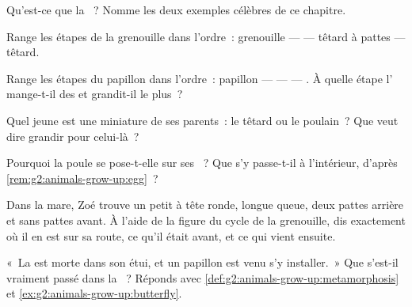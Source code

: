 \begin{exercise}[$\star$]\label{exo:g2:animals-grow-up:4}
Qu'est-ce que la ~? Nomme les deux exemples célèbres de
ce chapitre.
\end{exercise}

\begin{exercise}[$\star$]\label{exo:g2:animals-grow-up:5}
Range les étapes de la grenouille dans l'ordre~: grenouille ---
 --- têtard à pattes --- têtard.
\end{exercise}

\begin{exercise}[$\star$]\label{exo:g2:animals-grow-up:6}
Range les étapes du papillon dans l'ordre~: papillon --- 
---  --- . À quelle étape l' mange-t-il des
 et grandit-il le plus~?
\end{exercise}

\begin{exercise}[$\star$]\label{exo:g2:animals-grow-up:7}
Quel jeune  est une miniature de ses parents~: le têtard ou le
poulain~? Que veut dire grandir pour celui-là~?
\end{exercise}

\begin{exercise}[$\star$]\label{exo:g2:animals-grow-up:8}
Pourquoi la poule se pose-t-elle sur ses ~? Que s'y passe-t-il à
l'intérieur, d'après \cref{rem:g2:animals-grow-up:egg}~?
\end{exercise}

\begin{exercise}[$\star\star$]\label{exo:g2:animals-grow-up:9}
Dans la mare, Zoé trouve un petit  à tête ronde, longue queue,
deux pattes arrière et sans pattes avant. À l'aide de la figure du
cycle de la grenouille, dis exactement où il en est sur sa route, ce
qu'il était avant, et ce qui vient ensuite.
\end{exercise}

\begin{exercise}[$\star\star$]\label{exo:g2:animals-grow-up:10}
«~La  est morte dans son étui, et un papillon est venu s'y
installer.~» Que s'est-il vraiment passé dans la ~?
Réponds avec \cref{def:g2:animals-grow-up:metamorphosis} et
\cref{ex:g2:animals-grow-up:butterfly}.
\end{exercise}
